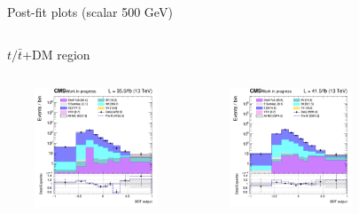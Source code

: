 \documentclass[8pt]{beamer}
\begin{document}
\begin{frame}{Post-fit plots (scalar 500 GeV)}
\begin{columns}
\begin{column}{1.09\textwidth}
\begin{block}{\centering $t/\bar t$+DM region}\end{block} \vspace{10pt}
\end{column}
\end{columns} \vspace{-24pt}
\begin{columns}
		\begin{column}{0.33\textwidth}
			\begin{center}
			\begin{block}{}\end{block}	
     			\includegraphics[width=1.0\textwidth, height=100pt]{figs/postfits/2016/log_cratio_ST_topCR_ll_BDT_tDM500_TTbar_BDT_output_scalar500_customBinsAttempt7.png}
    		\end{center}		
		\end{column} 
		\begin{column}{0.33\textwidth}
			\begin{center}
			\begin{block}{}\end{block}	
     			\includegraphics[width=1.0\textwidth, height=100pt]{figs/postfits/2017/log_cratio_ST_topCR_ll_BDT_tDM500_TTbar_BDT_output_scalar500_customBinsAttempt7.png}
    		\end{center}		
		\end{column} 
		\begin{column}{0.33\textwidth}
			\begin{center}
			\begin{block}{}\end{block}	

\end{center}
\end{column}
\end{columns}
\end{frame}
\end{document}
